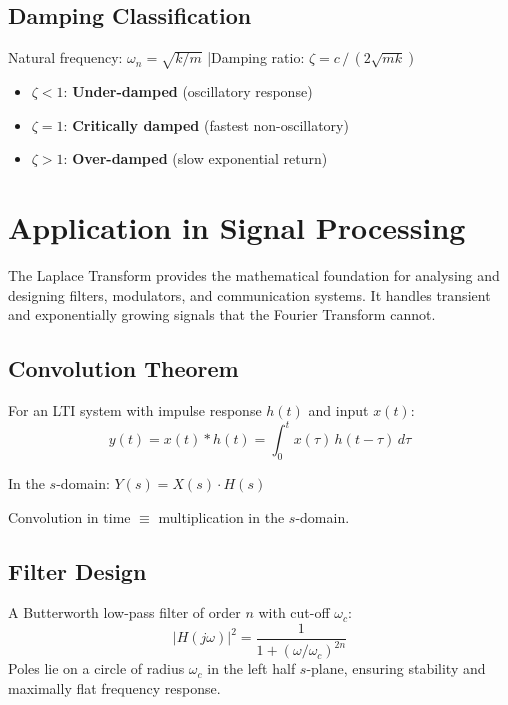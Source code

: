 \documentclass[12pt]{article}
\begin{document}
\subsection*{Damping Classification}

\begin{conceptbox}
Natural frequency: $\omega_n = \sqrt{k/m}$ \quad|\quad Damping ratio: $\zeta = c\,/\,(2\sqrt{mk})$
\begin{itemize}[noitemsep, topsep=4pt]
  \item $\zeta < 1$: \textbf{Under-damped} (oscillatory response)
  \item $\zeta = 1$: \textbf{Critically damped} (fastest non-oscillatory)
  \item $\zeta > 1$: \textbf{Over-damped} (slow exponential return)
\end{itemize}
\end{conceptbox}

\section{Application in Signal Processing}

The Laplace Transform provides the mathematical foundation for analysing and designing filters,
modulators, and communication systems. It handles transient and exponentially growing signals
that the Fourier Transform cannot.

\subsection*{Convolution Theorem}

For an LTI system with impulse response $h(t)$ and input $x(t)$:
\[
  y(t) = x(t)*h(t) = \int_0^t x(\tau)\,h(t-\tau)\,d\tau
\]

\begin{formulabox}
In the $s$-domain: \quad $Y(s) = X(s)\cdot H(s)$

Convolution in time $\equiv$ multiplication in the $s$-domain.
\end{formulabox}

\subsection*{Filter Design}

A Butterworth low-pass filter of order $n$ with cut-off $\omega_c$:
\[
  |H(j\omega)|^2 = \frac{1}{1 + (\omega/\omega_c)^{2n}}
\]
Poles lie on a circle of radius $\omega_c$ in the left half $s$-plane, ensuring stability and
maximally flat frequency response.
\end{document}
